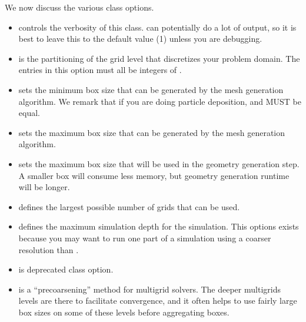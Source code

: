 \documentclass[letterpaper,10pt,english]{sphinxmanual}
\begin{document}
We now discuss the various  class options.
\begin{itemize}
\item {} 
 controls the verbosity of this class.  can potentially do a lot of output, so it is best to leave this to the default value (\sphinxhyphen{}1) unless you are debugging.

\item {} 
 is the partitioning of the  grid level that discretizes your problem domain. The entries in this option must all be integers of .

\item {} 
 sets the minimum box size that can be generated by the mesh generation algorithm. We remark that if you are doing particle deposition,  and  MUST be equal.

\item {} 
 sets the maximum box size that can be generated by the mesh generation algorithm.

\item {} 
 sets the maximum box size that will be used in the geometry generation step. A smaller box will consume less memory, but geometry generation runtime will be longer.

\item {} 
 defines the largest possible number of grids that can be used.

\item {} 
 defines the maximum simulation depth for the simulation. This options exists because you may want to run one part of a simulation using a coarser resolution than .

\item {} 
 is deprecated class option.

\item {} 
 is a “pre\sphinxhyphen{}coarsening” method for multigrid solvers. The deeper multigrids levels are there to facilitate convergence, and it often helps to use fairly large box sizes on some of these levels before aggregating boxes.


\end{itemize}
\end{document}
